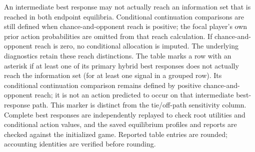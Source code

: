 An intermediate best response may not actually reach an information set that is
reached in both endpoint equilibria. Conditional continuation comparisons are
still defined when chance-and-opponent reach is positive; the focal player's
own prior action probabilities are omitted from that reach calculation. If
chance-and-opponent reach is zero, no conditional allocation is imputed. The
underlying diagnostics retain these reach distinctions.
The table marks a row with an asterisk if at least one of its primary hybrid
best responses does not actually reach the information set (for at least one
signal in a grouped row). Its conditional continuation comparison remains
defined by positive chance-and-opponent reach; it is not an action predicted
to occur on that intermediate best-response path. This marker is distinct from
the tie/off-path sensitivity column. Complete best responses
are independently replayed to check root utilities and conditional action
values, and the saved equilibrium profiles and reports are checked against the
initialized game. Reported table entries are rounded; accounting identities are
verified before rounding.
